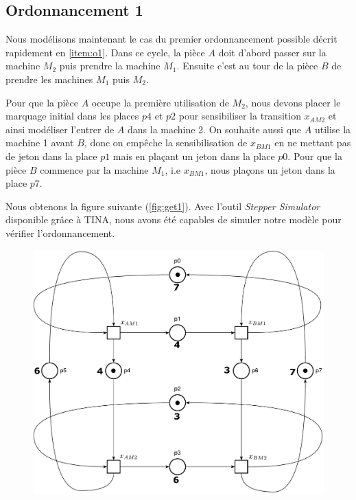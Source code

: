 \subsection{Ordonnancement 1}\label{sub:ordo1}

Nous modélisons maintenant le cas du premier ordonnancement possible décrit rapidement en \ref{item:o1}. Dans ce cycle, la pièce $A$ doit d'abord passer sur la machine $M_2$ puis prendre la machine $M_1$. Ensuite c'est au tour de la pièce $B$ de prendre les machines $M_1$ puis $M_2$. 

Pour que la pièce $A$ occupe la première utilisation de $M_2$, nous devons placer le marquage initial dans les places $p4$ et $p2$ pour sensibiliser la transition $x_{AM2}$ et ainsi modéliser l'entrer de $A$ dans la machine 2. On souhaite aussi que $A$ utilise la machine 1 avant $B$, donc on empêche la sensibilisation de $x_{BM1}$ en ne mettant pas de jeton dans la place $p1$ mais en plaçant un jeton dans la place $p0$. Pour que la pièce $B$ commence par la machine $M_1$, i.e $x_{BM1}$, nous plaçons un jeton dans la place $p7$. 

Nous obtenons la figure suivante (\ref{fig:get1}). Avec l'outil \emph{Stepper Simulator} disponible grâce à TINA, nous avons été capables de simuler notre modèle pour vérifier l'ordonnancement.
\begin{figure}
\begin{center}
\includegraphics[width = .75\textwidth]{./II/images/GET_1.pdf}
\end{center}
\end{figure}
 
